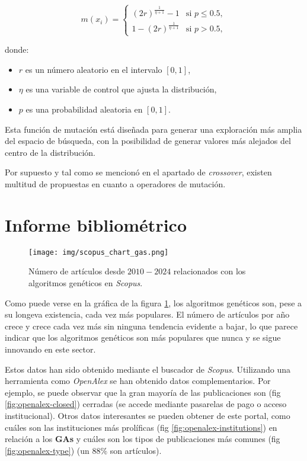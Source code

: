 \documentclass[12pt,letterpaper]{article}
\begin{document}
\begin{equation}
    m(x_i) =
    \begin{cases}
        (2r)^{\frac{1}{\eta + 1}} - 1 & \text{si } p \leq 0.5, \\
        1 - (2r)^{\frac{1}{\eta + 1}} & \text{si } p > 0.5,
    \end{cases}
    \label{eq:cauchy_mutation}
\end{equation}

donde:
\begin{itemize}
    \item \( r \) es un número aleatorio en el intervalo \([0, 1]\),
    \item \( \eta \) es una variable de control que ajusta la distribución,
    \item \( p \) es una probabilidad aleatoria en \([0, 1]\).
\end{itemize}

Esta función de mutación está diseñada para generar una exploración más amplia del espacio de búsqueda, con la posibilidad de generar valores más alejados del centro de la distribución.

Por supuesto y tal como se mencionó en el apartado de \textit{crossover}, existen multitud de propuestas en cuanto a operadores de mutación.

\section{Informe bibliométrico}

\begin{figure}[htp]
    \centering
    \texttt{[image: img/scopus\_chart\_gas.png]}
    \caption{Número de artículos desde $2010-2024$ relacionados con los algoritmos genéticos en \textit{Scopus}.}
    \label{fig:scopus}
\end{figure}

Como puede verse en la gráfica de la figura \ref{fig:scopus}, los algoritmos genéticos son, pese a su longeva existencia, cada vez más populares. El número de artículos por año crece y crece cada vez más sin ninguna tendencia evidente a bajar, lo que parece indicar que los algoritmos genéticos son más populares que nunca y se sigue innovando en este sector.

Estos datos han sido obtenido mediante el buscador de \textit{Scopus}. Utilizando una herramienta como \textit{OpenAlex} se han obtenido datos complementarios. Por ejemplo, se puede observar que la gran mayoría de las publicaciones son (fig \ref{fig:openalex-closed}) cerradas (se accede mediante pasarelas de pago o acceso institucional). Otros datos interesantes se pueden obtener de este portal, como cuáles son las instituciones más prolíficas (fig \ref{fig:openalex-institutions}) en relación a los \textbf{GAs} y cuáles son los tipos de publicaciones más comunes (fig \ref{fig:openalex-type}) (un $88\%$ son artículos).
\end{document}

